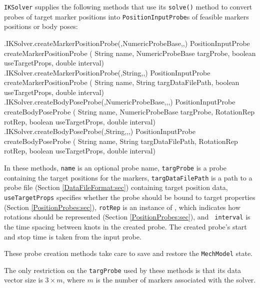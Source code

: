 {\tt IKSolver} supplies the following methods that use its {\tt solve()} method
to convert probes of target marker positions into {\tt PositionInputProbe}s of
feasible markers positions or body poses:
%
\begin{methodtable}{0.9}{0.1}
\midline
%
\methodspace{0.5em}%
\methodentry
{\probes.IKSolver.createMarkerPositionProbe(,NumericProbeBase,,)}%
{PositionInputProbe createMarkerPositionProbe (%
String name, NumericProbeBase targProbe,\brh
boolean useTargetProps, double interval)}%
{\ }%
%
\methodspace{0.5em}%
\methodentry
{\probes.IKSolver.createMarkerPositionProbe(,String,,)}%
{PositionInputProbe createMarkerPositionProbe (%
String name, String targDataFilePath,\brh
boolean useTargetProps, double interval)}%
{\ }%
%
\methodspace{0.5em}%
\methodentry
{\probes.IKSolver.createBodyPoseProbe(,NumericProbeBase,,,)}%
{PositionInputProbe createBodyPoseProbe (%
String name, NumericProbeBase targProbe,\brh
RotationRep rotRep, boolean useTargetProps, double interval)}%
{\ }%
%
\methodspace{0.5em}%
\methodentry
{\probes.IKSolver.createBodyPoseProbe(,String,,,)}%
{PositionInputProbe createBodyPoseProbe (%
String name, String targDataFilePath,\brh
RotationRep rotRep, boolean useTargetProps, double interval)}%
{\ }%
%
\midline
\end{methodtable}
%
In these methods, {\tt name} is an optional probe name, {\tt targProbe} is a
probe containing the target positions for the markers, {\tt targDataFilePath}
is a path to a probe file (Section \ref{DataFileFormat:sec}) containing target
position data, {\tt useTargetProps} specifies whether the probe should be bound
to target properties (Section \ref{PositionProbes:sec}), {\tt rotRep} is an
instance of , which indicates how
rotations should be represented (Section \ref{PositionProbes:sec}), and {\tt
interval} is the time spacing between knots in the created probe.  The created
probe's start and stop time is taken from the input probe.

\begin{sideblock}
These probe creation methods take care to save and restore the {\tt MechModel}
state.
\end{sideblock}

\begin{sideblock}
The only restriction on the {\tt targProbe} used by these methods is that its
data vector size is $3 \times m$, where $m$ is the number of markers associated
with the solver.
\end{sideblock}


